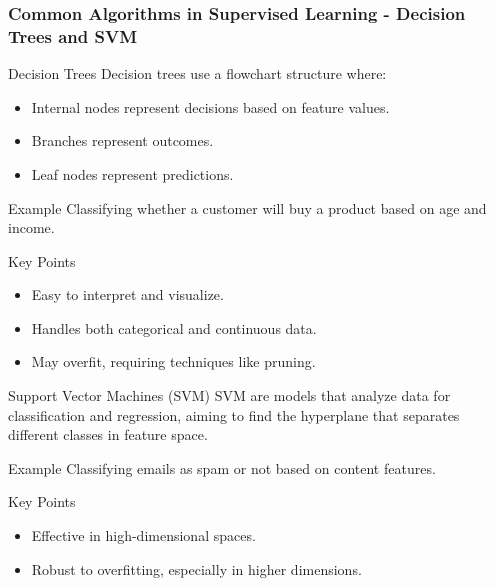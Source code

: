 \documentclass[aspectratio=169]{beamer}
\begin{document}
\begin{frame}[fragile]
    \frametitle{Common Algorithms in Supervised Learning - Decision Trees and SVM}
    \begin{block}{Decision Trees}
        Decision trees use a flowchart structure where:
        \begin{itemize}
            \item Internal nodes represent decisions based on feature values.
            \item Branches represent outcomes.
            \item Leaf nodes represent predictions.
        \end{itemize}
        \begin{block}{Example}
            Classifying whether a customer will buy a product based on age and income.
        \end{block}
        \begin{block}{Key Points}
            \begin{itemize}
                \item Easy to interpret and visualize.
                \item Handles both categorical and continuous data.
                \item May overfit, requiring techniques like pruning.
            \end{itemize}
        \end{block}
    \end{block}

    \begin{block}{Support Vector Machines (SVM)}
        SVM are models that analyze data for classification and regression, aiming to find the hyperplane that separates different classes in feature space.
        \begin{block}{Example}
            Classifying emails as spam or not based on content features.
        \end{block}
        \begin{block}{Key Points}
            \begin{itemize}
                \item Effective in high-dimensional spaces.
                \item Robust to overfitting, especially in higher dimensions.
            \end{itemize}
        \end{block}
    \end{block}
\end{frame}
\end{document}
